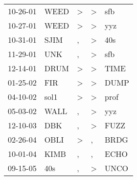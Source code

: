 \begin{supertabular}{lllll}
 10-26-01 &  WEED &  \textgreater &  \textgreater &   sfb \\
 10-27-01 &  WEED &  \textgreater &  \textgreater &   yyz \\
 10-31-01 &  SJIM &             , &  \textgreater &   40s \\
 11-29-01 &   UNK &             , &  \textgreater &   sfb \\
 12-14-01 &  DRUM &  \textgreater &  \textgreater &  TIME \\
 01-25-02 &   FIR &  \textgreater &  \textgreater &  DUMP \\
 04-10-02 &  sol1 &  \textgreater &  \textgreater &  prof \\
 05-03-02 &  WALL &             , &  \textgreater &   yyz \\
 12-10-03 &   DBK &             , &  \textgreater &  FUZZ \\
 02-26-04 &  OBLI &  \textgreater &             , &  BRDG \\
 10-01-04 &  KIMB &             , &             , &  ECHO \\
 09-15-05 &   40s &             , &  \textgreater &  UNCO \\
\end{supertabular}
